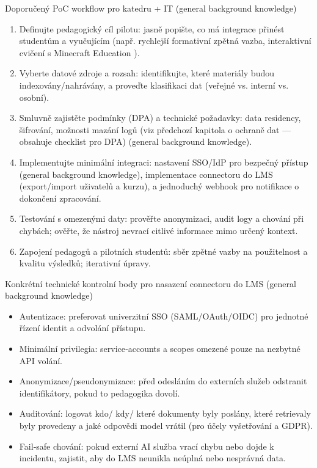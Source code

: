 \documentclass{report}%
\begin{document}
Doporučený PoC workflow pro katedru + IT (general background knowledge)
\begin{enumerate}
  \item Definujte pedagogický cíl pilotu: jasně popište, co má integrace přinést studentům a vyučujícím (např. rychlejší formativní zpětná vazba, interaktivní cvičení s Minecraft Education \cite{kb_ai_101_tipu_pdf_04e4a115_page_15_2}).
  \item Vyberte datové zdroje a rozsah: identifikujte, které materiály budou indexovány/nahrávány, a proveďte klasifikaci dat (veřejné vs. interní vs. osobní).
  \item Smluvně zajistěte podmínky (DPA) a technické požadavky: data residency, šifrování, možnosti mazání logů (viz předchozí kapitola o ochraně dat — obsahuje checklist pro DPA) (general background knowledge).
  \item Implementujte minimální integraci: nastavení SSO/IdP pro bezpečný přístup (general background knowledge), implementace connectoru do LMS (export/import uživatelů a kurzu), a jednoduchý webhook pro notifikace o dokončení zpracování.
  \item Testování s omezenými daty: prověřte anonymizaci, audit logy a chování při chybách; ověřte, že nástroj nevrací citlivé informace mimo určený kontext.
  \item Zapojení pedagogů a pilotních studentů: sběr zpětné vazby na použitelnost a kvalitu výsledků; iterativní úpravy.
\end{enumerate}

Konkrétní technické kontrolní body pro nasazení connectoru do LMS (general background knowledge)
\begin{itemize}
  \item Autentizace: preferovat univerzitní SSO (SAML/OAuth/OIDC) pro jednotné řízení identit a odvolání přístupu.
  \item Minimální privilegia: service‑accounts a scopes omezené pouze na nezbytné API volání.
  \item Anonymizace/pseudonymizace: před odesláním do externích služeb odstranit identifikátory, pokud to pedagogika dovolí.
  \item Auditování: logovat kdo/ kdy/ které dokumenty byly poslány, které retrievaly byly provedeny a jaké odpovědi model vrátil (pro účely vyšetřování a GDPR).
  \item Fail‑safe chování: pokud externí AI služba vrací chybu nebo dojde k incidentu, zajistit, aby do LMS neunikla neúplná nebo nesprávná data.
\end{itemize}
\end{document}
